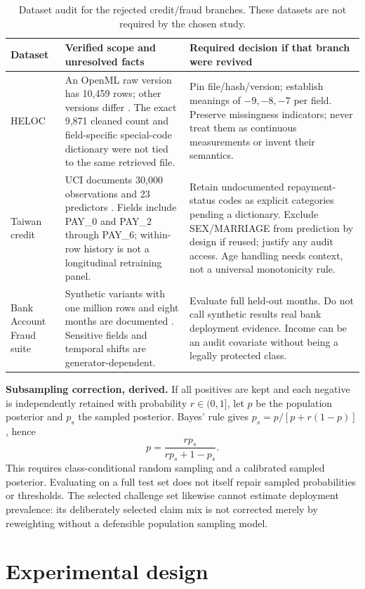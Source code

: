 \documentclass[11pt,a4paper]{article}
\newcommand{\pbreak}{\clearpage}
\newcommand{\lead}[1]{\textbf{\color{navy}#1}}
\begin{document}
\begin{table}[H]\caption{Dataset audit for the rejected credit/fraud branches. These datasets are not required by the chosen study.}
\footnotesize\begin{tabularx}{\linewidth}{p{.16\linewidth}YY}\toprule
Dataset & Verified scope and unresolved facts & Required decision if that branch were revived\\\midrule
HELOC & An OpenML raw version has 10,459 rows; other versions differ \cite{heloc}. The exact 9,871 cleaned count and field-specific special-code dictionary were not tied to the same retrieved file. & Pin file/hash/version; establish meanings of $-9,-8,-7$ per field. Preserve missingness indicators; never treat them as continuous measurements or invent their semantics.\\
Taiwan credit & UCI documents 30,000 observations and 23 predictors \cite{taiwan}. Fields include PAY\_0 and PAY\_2 through PAY\_6; within-row history is not a longitudinal retraining panel. & Retain undocumented repayment-status codes as explicit categories pending a dictionary. Exclude SEX/MARRIAGE from prediction by design if reused; justify any audit access. Age handling needs context, not a universal monotonicity rule.\\
Bank Account Fraud suite & Synthetic variants with one million rows and eight months are documented \cite{baf}. Sensitive fields and temporal shifts are generator-dependent. & Evaluate full held-out months. Do not call synthetic results real bank deployment evidence. Income can be an audit covariate without being a legally protected class.\\\bottomrule
\end{tabularx}\end{table}

\lead{Subsampling correction, derived.} If all positives are kept and each negative is independently retained with probability $r\in(0,1]$, let $p$ be the population posterior and $p_s$ the sampled posterior. Bayes' rule gives $p_s=p/[p+r(1-p)]$, hence
\[
p=\frac{r p_s}{r p_s+1-p_s}.
\]
This requires class-conditional random sampling and a calibrated sampled posterior. Evaluating on a full test set does not itself repair sampled probabilities or thresholds. The selected challenge set likewise cannot estimate deployment prevalence: its deliberately selected claim mix is not corrected merely by reweighting without a defensible population sampling model.

\pbreak
\section{Experimental design}
\end{document}
